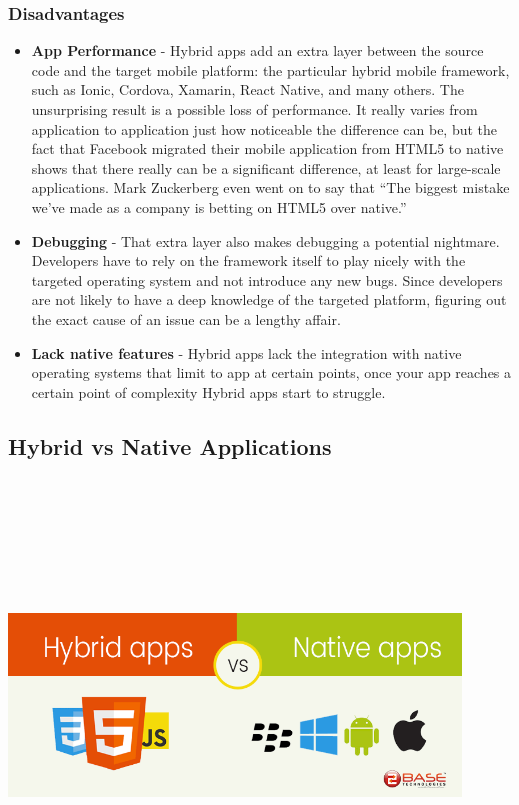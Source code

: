 \subsubsection{Disadvantages}
\begin{itemize}
    \item \textbf{App Performance} - Hybrid apps add an extra layer between the source code and the target mobile platform: the particular hybrid mobile framework, such as Ionic, Cordova, Xamarin, React Native, and many others. The unsurprising result is a possible loss of performance. It really varies from application to application just how noticeable the difference can be, but the fact that Facebook migrated their mobile application from HTML5 to native shows that there really can be a significant difference, at least for large-scale applications. Mark Zuckerberg even went on to say that “The biggest mistake we've made as a company is betting on HTML5 over native.”
    \item \textbf{Debugging} - That extra layer also makes debugging a potential nightmare. Developers have to rely on the framework itself to play nicely with the targeted operating system and not introduce any new bugs. Since developers are not likely to have a deep knowledge of the targeted platform, figuring out the exact cause of an issue can be a lengthy affair.
    \item \textbf{Lack native features} - Hybrid apps lack the integration with native operating systems that limit to app at certain points, once your app reaches a certain point of complexity Hybrid apps start to struggle.
\end{itemize}

\subsection{Hybrid vs Native Applications}
\par
\medskip
\begin{center}
    \includegraphics[width=12cm,height=12cm,keepaspectratio]{Images/hybridvnative.png}
\end{center}

